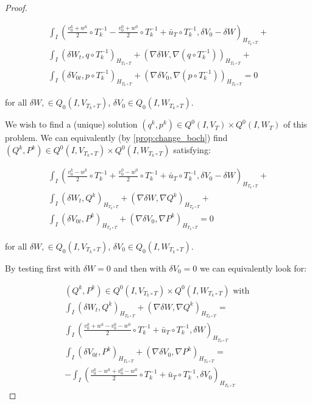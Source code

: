 \documentclass[english,a4paper,12pt,oneside]{scrbook}
\theoremstyle{break}
\newenvironment{mproof}[1][\proofname]{%
  \begin{proof}[#1]$ $\par\nobreak\ignorespaces
}{%
  \end{proof}
}
\renewcommand*{\proofname}{Proof}
\theoremstyle{remark}
\begin{document}
\begin{mproof}
\begin{align*}
\int_I \left (\frac{v_0^k+w^k}{2}\circ T_k^{-1}- \frac{v_0^0+w^0}{2}\circ T_k^{-1}+\bar{u}_T\circ T_k^{-1} ,\delta V_0-\delta W\right)_{H_{T_k \circ T}}+\\
\int_I ( \delta W_t , q\circ T_k^{-1})_{H_{T_k \circ T}}+ (\nabla\delta W, \nabla( q\circ T_k^{-1}))_{H_{T_k \circ T}}+\\
\int_I ( \delta V_{0t},p \circ T_k^{-1})_{H_{T_k \circ T}} + ( \nabla \delta V_0, \nabla (p\circ T_k^{-1}))_{H_{T_k \circ T}} = 0
\end{align*}

for all $\delta W, \in Q_0(I, V_{T_k \circ T})$, $ \delta V_{0} \in Q_0(I,W_{T_k \circ T})$.

We wish to find a (unique) solution $(q^k, p^k) \in Q^0(I, V_T)\times Q^0(I, W_T)$ of this problem. We can equivalently (by \cref{prop:change_boch}) find $(Q^k, P^k) \in Q^0(I, V_{T_k \circ T})\times Q^0(I, W_{T_k \circ T})$ satisfying:

\begin{align*}
\int_I \left (\frac{v_0^k-w^k}{2}\circ T_k^{-1}+ \frac{v_0^0-w^0}{2}\circ T_k^{-1}+\bar{u}_T\circ T_k^{-1} ,\delta V_0-\delta W\right)_{H_{T_k \circ T}}+\\
\int_I (\delta W_t ,Q^k )_{H_{T_k \circ T}}+ (\nabla \delta W, \nabla Q^k)_{H_{T_k \circ T}}+\\
\int_I( \delta V_{0t},P^k)_{H_{T_k \circ T}} + ( \nabla \delta V_0, \nabla P^k)_{H_{T_k \circ T}} = 0
\end{align*}

for all $\delta W, \in Q_0(I, V_{T_k \circ T})$, $ \delta V_{0} \in Q_0(I,W_{T_k \circ T})$.

By testing first with $\delta W=0$ and then with $\delta V_0=0$ we can equivalently look for:

\begin{align*}
(Q^k, P^k) \in Q^0(I, V_{T_k \circ T})\times Q^0(I, W_{T_k \circ T}) \text{ with }\\
\int_I (\delta W_t ,Q^k)_{H_{T_k \circ T}}+ (\nabla \delta W, \nabla Q^k)_{H_{T_k \circ T}} =\\ \int_I \left (\frac{v_0^k+w^k-v_0^0-w^0}{2}\circ T_k^{-1}+\bar{u}_T\circ T_k^{-1} ,\delta W\right)_{H_{T_k \circ T}}\\
\int_I ( \delta V_{0t},P^k)_{H_{T_k \circ T}}+ ( \nabla \delta V_0, \nabla P^k)_{H_{T_k \circ T}} =\\- \int_I \left (\frac{v_0^k-w^k+v_0^0-w^0}{2}\circ T_k^{-1}+\bar{u}_T\circ T_k^{-1} ,\delta V_0\right)_{H_{T_k \circ T}}
\end{align*}


\end{mproof}
\end{document}
